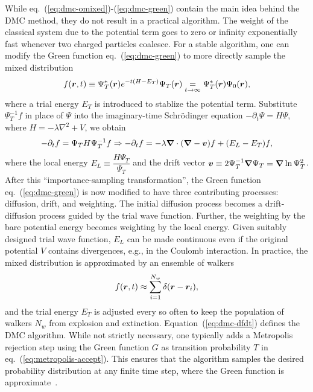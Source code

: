 While eq.~(\ref{eq:dmc-omixed})-(\ref{eq:dmc-green}) contain the main idea behind the DMC method, they do not result in a practical algorithm. The weight of the classical system due to the potential term goes to zero or infinity exponentially fast whenever two charged particles coalesce. For a stable algorithm, one can modify the Green function eq.~(\ref{eq:dmc-green}) to more directly sample the mixed distribution
\begin{align}
f(\boldsymbol{r},t) \equiv \Psi_T^*(\boldsymbol{r}) e^{-t(H-E_T)}\Psi_T(\boldsymbol{r}) \underset{t\rightarrow\infty}{=} \Psi_T^*(\boldsymbol{r})\Psi_0(\boldsymbol{r}),
\end{align}
where a trial energy $E_T$ is introduced to stablize the potential term.
Substitute $\Psi_T^{-1}f$ in place of $\Psi$ into the imaginary-time Schr\"odinger equation $-\partial_t \Psi = H\Psi$, where $H=-\lambda\nabla^2+V$, we obtain
\begin{align} \label{eq:dmc-dfdt}
-\partial_t f = \Psi_T H \Psi_T^{-1} f \Rightarrow -\partial_t f=-\lambda\boldsymbol{\nabla}\cdot(\boldsymbol{\nabla}-\boldsymbol{v})f+(E_L-E_T)f,
\end{align}
where the local energy $E_L\equiv \dfrac{H\Psi_T}{\Psi_T}$ and the drift vector $\boldsymbol{v}\equiv2\Psi_T^{-1}\boldsymbol{\nabla}\Psi_T=\boldsymbol{\nabla}\ln\Psi_T^2$.
After this ``importance-sampling transformation'', the Green function eq.~(\ref{eq:dmc-green}) is now modified to have three contributing processes: diffusion, drift, and weighting. The initial diffusion process becomes a drift-diffusion process guided by the trial wave function. Further, the weighting by the bare potential energy becomes weighting by the local energy. Given suitably designed trial wave function, $E_L$ can be made continuous even if the original potential $V$ contains divergences, e.g., in the Coulomb interaction.
In practice, the mixed distribution is approximated by an ensemble of walkers
\begin{align}
f(\boldsymbol{r},t) \approx \sum\limits_{i=1}^{N_w} \delta(\boldsymbol{r}-\boldsymbol{r}_i),
\end{align}
and the trial energy $E_T$ is adjusted every so often to keep the population of walkers $N_w$ from explosion and extinction. Equation~(\ref{eq:dmc-dfdt}) defines the DMC algorithm.
While not strictly necessary, one typically adds a Metropolis rejection step using the Green function $G$ as transition probability $T$ in eq.~(\ref{eq:metropolis-accept}). This ensures that the algorithm samples the desired probability distribution at any finite time step, where the Green function is approximate~\cite{Reynolds1982}.

